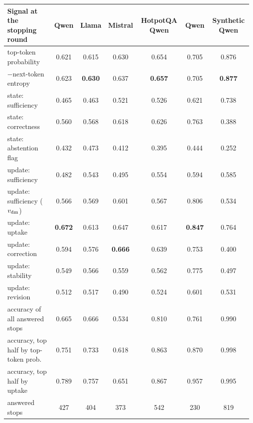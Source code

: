 \begin{tabular}{lcccccc}
\toprule
Signal at the stopping round & \musique{} Qwen & \musique{} Llama & \musique{} Mistral & HotpotQA Qwen & \twowiki{} Qwen & Synthetic Qwen \\
\midrule
top-token probability & 0.621 & 0.615 & 0.630 & 0.654 & 0.705 & 0.876 \\
$-$next-token entropy & 0.623 & \textbf{0.630} & 0.637 & \textbf{0.657} & 0.705 & \textbf{0.877} \\
state: sufficiency & 0.465 & 0.463 & 0.521 & 0.526 & 0.621 & 0.738 \\
state: correctness & 0.560 & 0.568 & 0.618 & 0.626 & 0.763 & 0.388 \\
state: abstention flag & 0.432 & 0.473 & 0.412 & 0.395 & 0.444 & 0.252 \\
update: sufficiency & 0.482 & 0.543 & 0.495 & 0.554 & 0.594 & 0.585 \\
update: sufficiency ($v_{\mathrm{dm}}$) & 0.566 & 0.569 & 0.601 & 0.567 & 0.806 & 0.534 \\
update: uptake & \textbf{0.672} & 0.613 & 0.647 & 0.617 & \textbf{0.847} & 0.764 \\
update: correction & 0.594 & 0.576 & \textbf{0.666} & 0.639 & 0.753 & 0.400 \\
update: stability & 0.549 & 0.566 & 0.559 & 0.562 & 0.775 & 0.497 \\
update: revision & 0.512 & 0.517 & 0.490 & 0.524 & 0.601 & 0.531 \\
\midrule
accuracy of all answered stops & 0.665 & 0.666 & 0.534 & 0.810 & 0.761 & 0.990 \\
accuracy, top half by top-token prob. & 0.751 & 0.733 & 0.618 & 0.863 & 0.870 & 0.998 \\
accuracy, top half by uptake & 0.789 & 0.757 & 0.651 & 0.867 & 0.957 & 0.995 \\
answered stops & 427 & 404 & 373 & 542 & 230 & 819 \\
\bottomrule
\end{tabular}